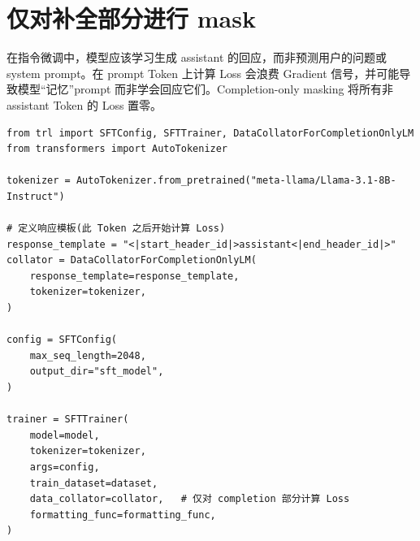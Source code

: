\section{仅对补全部分进行 mask}
\label{sec:completion-masking}

\begin{intuitionbox}[为何要 mask prompt?]
在指令微调中，模型应该学习生成 assistant 的回应，而非预测用户的问题或 system prompt。在 prompt Token 上计算 Loss 会浪费 Gradient 信号，并可能导致模型“记忆”prompt 而非学会回应它们。Completion-only masking 将所有非 assistant Token 的 Loss 置零。
\end{intuitionbox}

\begin{examplebox}
\begin{lstlisting}[style=pythonstyle]
from trl import SFTConfig, SFTTrainer, DataCollatorForCompletionOnlyLM
from transformers import AutoTokenizer

tokenizer = AutoTokenizer.from_pretrained("meta-llama/Llama-3.1-8B-Instruct")

# 定义响应模板(此 Token 之后开始计算 Loss)
response_template = "<|start_header_id|>assistant<|end_header_id|>"
collator = DataCollatorForCompletionOnlyLM(
    response_template=response_template,
    tokenizer=tokenizer,
)

config = SFTConfig(
    max_seq_length=2048,
    output_dir="sft_model",
)

trainer = SFTTrainer(
    model=model,
    tokenizer=tokenizer,
    args=config,
    train_dataset=dataset,
    data_collator=collator,   # 仅对 completion 部分计算 Loss
    formatting_func=formatting_func,
)
\end{lstlisting}
\end{examplebox}

